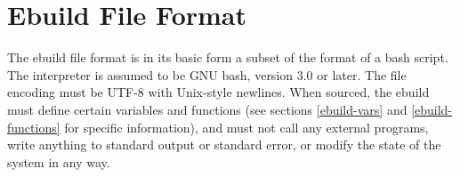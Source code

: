 \chapter{Ebuild File Format}
\label{ebuild-format}

The ebuild file format is in its basic form a subset of the format of a bash script. The interpreter
is assumed to be GNU bash, version 3.0 or later. The file encoding must be UTF-8 with Unix-style
newlines. When sourced, the
ebuild must define certain variables and functions (see sections \ref{ebuild-vars} and
\ref{ebuild-functions} for specific information), and must not call any external programs, write
anything to standard output or standard error, or modify the state of the system in any way.

